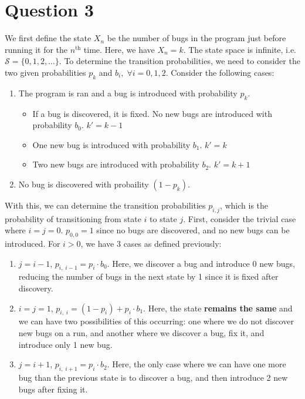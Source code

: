 \documentclass[12pt]{article}
\begin{document}
\section*{Question 3}

We first define the state $X_n$ be the number of bugs in the program just before running it for the $n^{\text{th}}$ time. Here, we have $X_n = k$. The state space is infinite, i.e. $\mathcal{S} = \{0,1,2,\dots\}$. To determine the transition probabilities, we need to consider the two given probabilities $p_k$ and $b_i, \; \forall i = 0, 1, 2$. Consider the following cases: \begin{enumerate}
    \item The program is ran and a bug is introduced with probability $p_k$. \begin{itemize}
        \item If a bug is discovered, it is fixed. No new bugs are introduced with probability $b_0$. $k' = k - 1$
        \item One new bug is introduced with probability $b_{1}$. $k' = k$
        \item Two new bugs are introduced with probability $b_{2}$. $k' = k + 1$
    \end{itemize}
    \item No bug is discovered with probaility $(1-p_k)$. 
\end{enumerate}

\noindent With this, we can determine the transition probabilities $p_{i,j}$, which is the probability of transitioning from state $i$ to state $j$. First, consider the trivial case where $i=j=0$. $p_{0,0} = 1$ since no bugs are discovered, and no new bugs can be introduced. For $i > 0$, we have 3 cases as defined previously: \begin{enumerate}
    \item $j = i - 1$, $p_{i, \; i-1} = p_i \cdot b_{0}$. Here, we discover a bug and introduce 0 new bugs, reducing the number of bugs in the next state by 1 since it is fixed after discovery. 
    \item $i = j = 1$, $p_{i,\;i} = (1-p_i) + p_i \cdot b_{1}$. Here, the state \textbf{remains the same} and we can have two possibilities of this occurring: one where we do not discover new bugs on a run, and another where we discover a bug, fix it, and introduce only 1 new bug. 
    \item $j = i + 1$, $p_{i, \; i+1} = p_i \cdot b_{2}$. Here, the only case where we can have one more bug than the previous state is to discover a bug, and then introduce 2 new bugs after fixing it. 
\end{enumerate}
\end{document}
